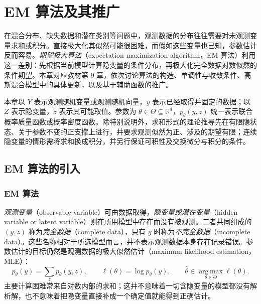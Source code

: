\setcounter{chapter}{8} %
\chapter{EM 算法及其推广}
\label{chap:lihang-em}

在混合分布、缺失数据和潜在类别等问题中，观测数据的分布往往需要对未观测变量求和或积分。直接极大化其似然可能很困难，而假如这些变量也已知，参数估计反而容易。\emph{期望极大算法}（expectation maximization algorithm，EM 算法）利用这一差别：先根据当前模型计算隐变量的条件分布，再极大化完全数据对数似然的条件期望。本章对应教材第 9 章，依次讨论算法的构造、单调性与收敛条件、高斯混合模型中的具体更新，以及基于辅助函数的推广。

本章以 $Y$ 表示观测随机变量或观测随机向量，$y$ 表示已经取得并固定的数据；以 $Z$ 表示隐变量，$z$ 表示其可能取值。参数为 $\theta\in\Theta\subseteq\mathbb R^d$，$p_\theta(y,z)$ 统一表示联合概率质量函数或概率密度函数。除特别说明外，求和形式的理论推导先在有限隐状态、关于参数不变的正支撑上进行，并要求观测似然为正、涉及的期望有限；连续隐变量的情形需将求和换成积分，并另行保证可积性及交换微分与积分的条件。

\section{EM 算法的引入}
\label{sec:lihang-em-introduction}

\subsection{EM 算法}
\label{subsec:lihang-em-algorithm}

\emph{观测变量}（observable variable）可由数据取得，\emph{隐变量或潜在变量}（hidden variable or latent variable）则在所用模型中存在而没有被观测。二者共同组成的 $(y,z)$ 称为\emph{完全数据}（complete data），只有 $y$ 时称为\emph{不完全数据}（incomplete data）。这些名称相对于所选模型而言，并不表示观测数据本身存在记录错误。参数估计的目标仍然是观测数据的极大似然估计（maximum likelihood estimation，MLE）：
\begin{equation}
  p_\theta(y)=\sum_z p_\theta(y,z),\qquad
  \ell(\theta)=\log p_\theta(y),\qquad
  \widehat\theta\in\operatorname*{arg\,max}_{\theta\in\Theta}\ell(\theta).
  \label{eq:lihang-em-observed-objective}
\end{equation}
主要计算困难常来自对数内部的求和；这并不意味着一切含隐变量的模型都没有解析解，也不意味着把隐变量直接补成一个确定值就能得到正确估计。

